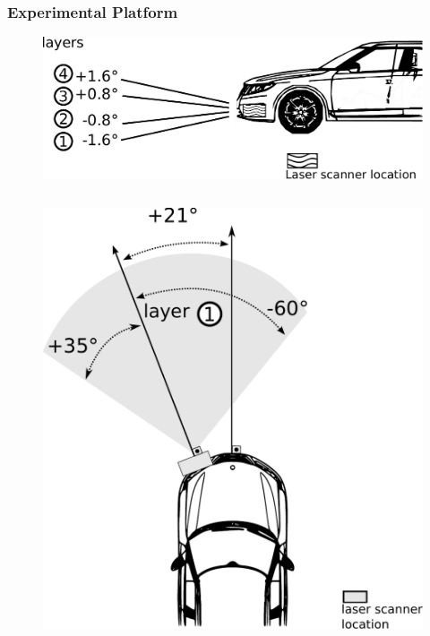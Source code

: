 \documentclass{beamer}
\begin{document}
	\begin{frame}
		\frametitle{Experimental Platform}	

		\begin{figure}[h]
			\center
			\includegraphics[scale=0.27]{../img/fig:demonstrator:lateral}
		\end{figure}

		 \begin{columns}[t]
		  \begin{column}{5cm}
		  \begin{figure}[h]
			\center
			\includegraphics[scale=0.27]{../img/fig:demonstrator:superior}
		  \end{figure}
		  \end{column}
		  

\end{columns}
\end{frame}
\end{document}
